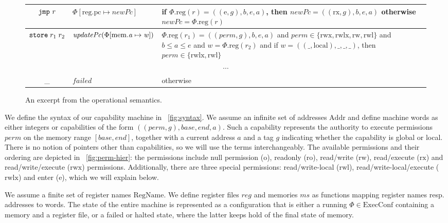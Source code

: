 \documentclass[compsoc,conference,letterpaper,fleqn]{IEEEtran}
\newcommand{\update}[2]{[#1 \mapsto #2]}
\newcommand\lau[1]{{\color{purple} \sf \footnotesize {LS: #1}}\\}
\newcommand{\var}[1]{\mathit{#1}}
\newcommand{\hs}{\var{ms}}
\newcommand{\ms}{\hs}
\newcommand{\lv}{\var{r}}
\newcommand{\gl}{\var{g}}
\newcommand{\pcreg}{\mathrm{pc}}
\newcommand{\addr}{\var{a}}
\newcommand{\start}{\var{b}}
\newcommand{\addrend}{\var{e}}
\newcommand{\reg}{\var{reg}}
\newcommand{\perm}{\var{perm}}
\newcommand{\stdcap}[1][(\perm,\gl)]{\left(#1,\start,\addrend,\addr \right)}
\newcommand{\plainproj}[1]{\mathrm{#1}}
\newcommand{\memreg}[1][\Phi]{#1.\plainproj{reg}}
\newcommand{\updateHeap}[3][\Phi]{#1\update{\plainproj{mem}.#2}{#3}}
\newcommand{\updateReg}[3][\Phi]{#1\update{\plainproj{reg}.#2}{#3}}
\newcommand{\failed}{\mathit{failed}}
\newcommand{\plainfun}[2]{
  \ifthenelse{\equal{#2}{}}
  {\mathit{#1}}
  {\mathit{#1}(#2)}
}
\newcommand{\stdUpdatePc}[1]{\plainfun{updatePc}{#1}}
\newcommand{\plaindom}[1]{\mathrm{#1}}
\newcommand{\Addrs}{\plaindom{Addr}}
\newcommand{\ExecConfs}{\plaindom{ExecConf}}
\newcommand{\RegName}{\plaindom{RegName}}
\newcommand{\refreg}[1]{#1}
\newcommand{\refheap}[1]{#1}
\newcommand{\zinstr}[1]{\mathtt{#1}}
\newcommand{\oneinstr}[2]{
  \ifthenelse{\equal{#2}{}}
  {\zinstr{#1}}
  {\zinstr{#1} \; #2}
}
\newcommand{\jmp}[1]{\oneinstr{jmp}{#1}}
\newcommand{\twoinstr}[3]{
  \ifthenelse{\equal{#2#3}{}}
  {\zinstr{#1}}
  {\zinstr{#1} \; #2 \; #3}
}
\newcommand{\store}[2]{\twoinstr{store}{#1}{#2}}
\newcommand{\plainperm}[1]{\mathrm{#1}}
\newcommand{\noperm}{\plainperm{o}}
\newcommand{\readonly}{\plainperm{ro}}
\newcommand{\readwrite}{\plainperm{rw}}
\newcommand{\exec}{\plainperm{rx}}
\newcommand{\entry}{\plainperm{e}}
\newcommand{\rwx}{\plainperm{rwx}}
\newcommand{\readwritel}{\plainperm{rwl}}
\newcommand{\rwlx}{\plainperm{rwlx}}
\newcommand{\local}{\plainperm{local}}
\begin{document}
\begin{figure}
\begin{tabular}{|c|p{4.3cm}|p{9.9cm}|}
    \hline
    $\jmp{\lv}$&$\updateReg{\pcreg}{\var{newPc}}$& \footnotesize{if }$\memreg(r) = ((\entry,\gl),\start,\addrend,\addr)$\footnotesize{, then} $\var{newPc} = ((\exec,\gl),\start,\addrend,\addr)$\newline
    \footnotesize{otherwise }$\var{newPc} = \memreg(r)$\\
    \hline
    $\store{\refheap{r_1}}{\refreg{r_2}}$&$\stdUpdatePc{\updateHeap{\addr}{\var{w}}}$&$\memreg(r_1) = \stdcap$\footnotesize{ and }$\perm \in \{ \rwx, \rwlx, \readwrite, \readwritel\}$ \footnotesize{ and } $\start \leq \addr \leq \addrend$\footnotesize{ and }$\var{w} = \memreg(r_2)$
                                                                                       \footnotesize{and if }$\var{w} = ((\_,\local),\_,\_,\_)$\footnotesize{, then  }$\perm \in \{\rwlx,\readwritel \}$\\
    \hline
    \multicolumn{3}{|c|}{$\cdots$}\\
    \hline
    \_&$\failed$&\footnotesize{otherwise}\\
    \hline
  \end{tabular}
  \caption{An excerpt from the operational semantics.}
  \label{fig:op-sem}
\end{figure}

We define the syntax of our capability machine in \figurename~\ref{fig:syntax}.
We assume an infinite set of addresses $\Addrs$ and define machine words as
either integers or capabilities of the form
$((\perm,\gl),\var{base},\var{end},\addr)$. Such a capability represents the
authority to execute permissions $\perm$ on the memory range
$[\var{base},\var{end}]$, together with a current address $\addr$ and a tag
$\gl$ indicating whether the capability is global or local. There is no notion
of pointers other than capabilities, so we will use the terms interchangeably.
The available permissions and their ordering are depicted in
\figurename~\ref{fig:perm-hier}: the permissions include null permission
($\noperm$), readonly ($\readonly$), read/write ($\readwrite$), read/execute
($\exec$) and read/write/execute ($\rwx$) permissions. Additionally, there are
three special permissions: read/write-local ($\readwritel$), read/write-local/execute
($\rwlx$) and enter ($\entry$), which we will explain below.

We assume a finite set of register names $\RegName$. We define register files
$\reg$ and memories $\ms$ as functions mapping register names resp. addresses to
words. The state of the entire machine is represented as a configuration that is
either a running $\Phi \in \ExecConfs$ containing a memory and a register file,
or a failed or halted state, where the latter keeps hold of the final state of
memory.
\end{document}
